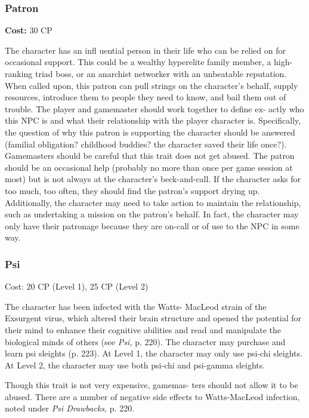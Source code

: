 \subsubsection{Patron}

\textbf{Cost:} 30 CP

The character has an infl uential person in their 
life who can be relied on for occasional support. 
This could be a wealthy hyperelite family member, a 
high-ranking triad boss, or an anarchist networker 
with an unbeatable reputation. When called upon, 
this patron can pull strings on the character's behalf, 
supply resources, introduce them to people they need 
to know, and bail them out of trouble. The player 
and gamemaster should work together to define ex-
actly who this NPC is and what their relationship 
with the player character is. Specifically, the question 
of why this patron is supporting the character should 
be answered (familial obligation? childhood buddies? 
the character saved their life once?). Gamemasters 
should be careful that this trait does not get abused. 
The patron should be an occasional help (probably 
no more than once per game session at most) but is 
not always at the character's beck-and-call. If the 
character asks for too much, too often, they should 
find the patron's support drying up. Additionally, the 
character may need to take action to maintain the 
relationship, such as undertaking a mission on the 
patron's behalf. In fact, the character may only have 
their patronage because they are on-call or of use to 
the NPC in some way.

\subsubsection{Psi}

Cost: 20 CP (Level 1), 25 CP (Level 2) 

The character has been infected with the Watts-
MacLeod strain of the Exsurgent virus, which altered 
their brain structure and opened the potential for their 
mind to enhance their cognitive abilities and read and 
manipulate the biological minds of others (see \textit{Psi,} 
p. 220). The character may purchase and learn psi 
sleights (p. 223). At Level 1, the character may only 
use psi-chi sleights. At Level 2, the character may use 
both psi-chi and psi-gamma sleights. 

Though this trait is not very expensive, gamemas-
ters should not allow it to be abused. There are a 
number of negative side effects to Watts-MacLeod 
infection, noted under \textit{Psi Drawbacks, }p. 220.

